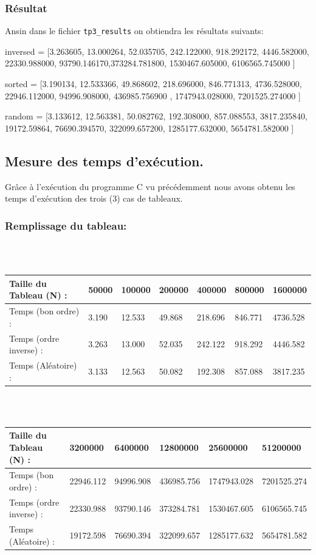 \documentclass[12pt]{article}
\begin{document}
\subsubsection{Résultat}
Ansin dans le fichier \texttt{tp3\_results} on obtiendra les résultats suivants:
\begin{sql}
inversed = [3.263605, 13.000264, 52.035705, 242.122000, 918.292172, 
 4446.582000, 22330.988000, 93790.146170,373284.781800, 1530467.605000,
  6106565.745000  ]
  
sorted = [3.190134, 12.533366, 49.868602, 218.696000, 846.771313, 
4736.528000, 22946.112000, 94996.908000, 436985.756900 , 1747943.028000,
 7201525.274000 ]
 
random = [3.133612, 12.563381, 50.082762, 192.308000, 857.088553,  
3817.235840, 19172.59864, 76690.394570, 322099.657200, 1285177.632000,
 5654781.582000 ]
\end{sql}

\subsection{Mesure des temps d'exécution.}
Grâce à l'exécution du programme C vu précédemment nous avons obtenu les temps d'exécution des trois (3) cas de tableaux.

\subsubsection{Remplissage du tableau:}
\color{blue}
\textrm{  }
\\
\\
\begin{tabular}{|p{3cm}||p{1.8cm}|p{1.8cm}|p{1.8cm}|p{1.8cm}|p{1.8cm}|p{1.8cm}|}
\hline
Taille du Tableau (N) : & 50000 & 100000 & 200000 & 400000 & 800000  & 1600000\\
\hline
Temps (bon ordre) : & 3.190 & 12.533 & 49.868 & 218.696 & 846.771 & 4736.528 \\
\hline

Temps (ordre inverse) :  & 3.263 & 13.000 & 52.035 & 242.122 & 918.292 & 4446.582 \\
\hline

Temps (Aléatoire) : & 3.133 & 12.563 & 50.082 & 192.308 & 857.088 & 3817.235 \\
\hline
\end{tabular}
\\
\\
\begin{tabular}{|p{3cm}||p{2cm}|p{2cm}|p{2cm}|p{2cm}|p{2cm}|}
\hline
Taille du Tableau (N) : & 3200000 & 6400000 & 12800000 & 25600000 &  51200000  \\
\hline

Temps (bon ordre) : & 22946.112 & 94996.908 & 436985.756 & 1747943.028 & 7201525.274  \\
\hline

Temps (ordre inverse) : &  22330.988 & 93790.146 & 373284.781 & 1530467.605 &  6106565.745  \\
\hline

Temps (Aléatoire) : & 19172.598 & 76690.394 & 322099.657 & 1285177.632 & 5654781.582  \\
\hline
\end{tabular}
\end{document}
